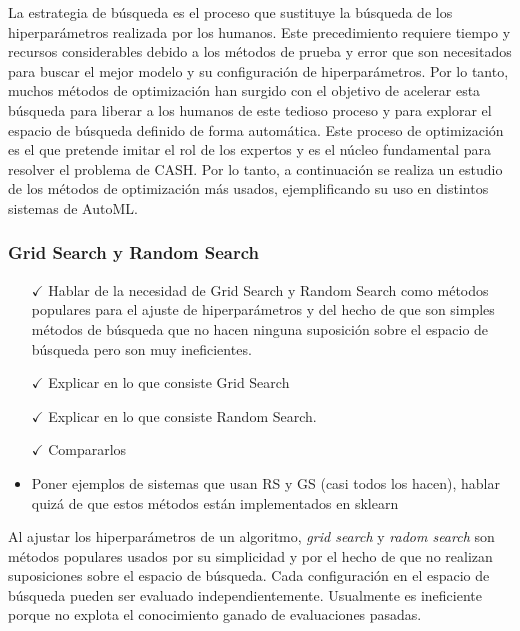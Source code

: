 La estrategia de búsqueda es el proceso que sustituye la búsqueda de los hiperparámetros realizada por los humanos. Este precedimiento requiere tiempo y recursos considerables debido a los métodos de prueba y error que son necesitados para buscar el mejor modelo y su configuración de hiperparámetros. Por lo tanto, muchos métodos de optimización han surgido con el objetivo de acelerar esta búsqueda para liberar a los humanos de este tedioso proceso y para explorar el espacio de búsqueda definido de forma automática. Este proceso de optimización es el que pretende imitar el rol de los expertos y es el núcleo fundamental para resolver el problema de CASH. Por lo tanto, a continuación se realiza un estudio de los métodos de optimización más usados, ejemplificando su uso en distintos sistemas de AutoML.


\subsubsection{Grid Search y Random Search}

\begin{itemize}
	\item[$\checkmark$] Hablar de la necesidad de Grid Search y Random Search como métodos populares para el ajuste de hiperparámetros y del hecho de que son simples métodos de búsqueda que no hacen ninguna suposición sobre el espacio de búsqueda pero son muy ineficientes.
	\item[$\checkmark$] Explicar en lo que consiste Grid Search
	\item[$\checkmark$] Explicar en lo que consiste Random Search.
	\item[$\checkmark$] Compararlos
	\item Poner ejemplos de sistemas que usan RS y GS (casi todos los hacen), hablar quizá de que estos métodos están implementados en sklearn
\end{itemize}

Al ajustar los hiperparámetros de un algoritmo, \textit{grid search} y \textit{radom search} son métodos populares usados por su simplicidad y por el hecho de que no realizan suposiciones sobre el espacio de búsqueda. Cada configuración en el espacio de búsqueda pueden ser evaluado independientemente. Usualmente es ineficiente porque no explota el conocimiento ganado de evaluaciones pasadas.

